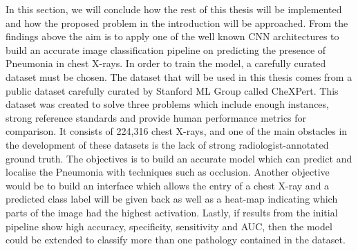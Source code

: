 In this section, we will conclude how the rest of this thesis will be implemented and how the proposed problem in the introduction will be approached. From the findings above the aim is to apply one of the well known CNN architectures to build an accurate image classification pipeline on predicting the presence of Pneumonia in chest X-rays. In order to train the model, a carefully curated dataset must be chosen.  The dataset that will be used in this thesis comes from a public dataset carefully curated by Stanford ML Group called CheXPert. This dataset was created to solve three problems which include enough instances, strong reference standards and provide human performance metrics for comparison. It consists of 224,316 chest X-rays, and one of the main obstacles in the development of these datasets is the lack of strong radiologist-annotated ground truth.
The objectives is to build an accurate model which can predict and localise the Pneumonia with techniques such as occlusion. Another objective would be to build an interface which allows the entry of a chest X-ray and a predicted class label will be given back as well as a heat-map indicating which parts of the image had the highest activation. 
Lastly, if results from the initial pipeline show high accuracy, specificity, sensitivity and AUC, then the model could be extended to classify more than one pathology contained in the dataset.

